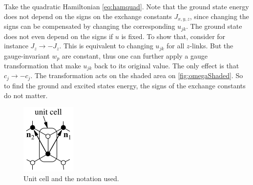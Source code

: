 		Take the quadratic Hamiltonian \eqref{eq:hamquad}. Note that the ground state energy does not depend on the signs on the exchange constants $J_{x,y,z}$, since changing the signs can be compensated by changing the corresponding $u_{jk}$. The ground state does not even depend on the signs if $u$ is fixed. To show that, consider for instance $J_z \to -J_z$. This is equivalent to changing $u_{jk}$ for all $z$-links. But the gauge-invariant $w_p$ are constant, thus one can further apply a gauge transformation that make $u_{jk}$ back to its original value. The only effect is that $c_j \to -c_j$. The transformation acts on the shaded area on \autoref{fig:omegaShaded}. So to find the ground and excited states energy, the signs of the exchange constants do not matter.

		\begin{figure}[h!]
            \centering
            \includegraphics[scale=0.8]{graphs/unitcellhoneylambda.png}
            \caption{Unit cell and the notation used.}
            \label{fig:unitcellhoneylambda}
        \end{figure}

